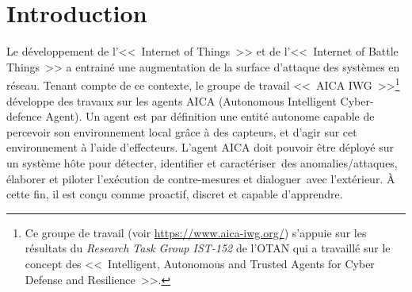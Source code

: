 




\section{Introduction}

Le développement de l'<<~Internet of Things~>> et de l'<<~Internet of Battle Things~>>  a entrainé une augmentation de la surface d'attaque des systèmes en réseau.
Tenant compte de ce contexte, le groupe de travail <<~AICA IWG~>>\footnote{Ce groupe de travail (voir \url{https://www.aica-iwg.org/}) s'appuie sur les résultats du \textit{Research Task Group IST-152} de l'OTAN qui a travaillé sur le concept des <<~Intelligent, Autonomous and Trusted Agents for Cyber Defense and Resilience~>>.} développe des travaux sur les agents AICA (Autonomous Intelligent Cyber-defence Agent).
Un agent est par définition une entité autonome capable de percevoir son environnement local grâce à des capteurs, et d’agir sur cet environnement à l'aide d'effecteurs\cite{russell1995modern}.
L'agent AICA doit pouvoir être déployé sur un système hôte pour détecter, identifier et caractériser des anomalies/attaques, élaborer et piloter l’exécution de contre-mesures et dialoguer avec l'extérieur. À cette fin, il est conçu comme proactif, discret et capable d’apprendre.


